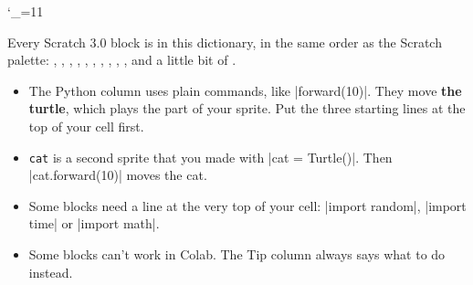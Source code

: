 {\catcode`\_=11 \gdef\blockmusic{\_penfalse\scr_normalblock{scrpen}}}


Every Scratch 3.0 block is in this dictionary, in the same order as the Scratch palette: , , , , , , , , , ,  and a little bit of .

\begin{itemize}
  \item The Python column uses plain commands, like \py|forward(10)|. They move \textbf{the turtle}, which plays the part of your sprite. Put the three starting lines at the top of your cell first.
  \item \texttt{cat} is a second sprite that you made with \py|cat = Turtle()|. Then \py|cat.forward(10)| moves the cat.
  \item Some blocks need a line at the very top of your cell: \py|import random|, \py|import time| or \py|import math|.
  \item Some blocks can't work in Colab. The Tip column always says what to do instead.
\end{itemize}

